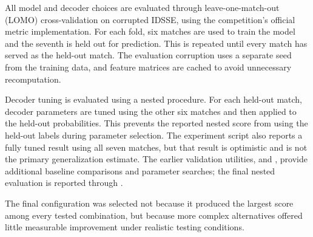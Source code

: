 \documentclass[11pt,a4paper]{article}
\begin{document}
All model and decoder choices are evaluated through leave-one-match-out (LOMO) cross-validation on corrupted IDSSE, using the competition's official metric implementation. For each fold, six matches are used to train the model and the seventh is held out for prediction. This is repeated until every match has served as the held-out match. The evaluation corruption uses a separate seed from the training data, and feature matrices are cached to avoid unnecessary recomputation.

Decoder tuning is evaluated using a nested procedure. For each held-out match, decoder parameters are tuned using the other six matches and then applied to the held-out probabilities. This prevents the reported nested score from using the held-out labels during parameter selection. The experiment script also reports a fully tuned result using all seven matches, but that result is optimistic and is not the primary generalization estimate. The earlier validation utilities,  and , provide additional baseline comparisons and parameter searches; the final nested evaluation is reported through .

The final configuration was selected not because it produced the largest score among every tested combination, but because more complex alternatives offered little measurable improvement under realistic testing conditions.
\end{document}
